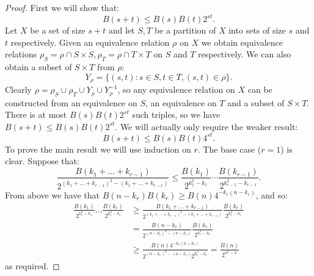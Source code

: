 \documentclass[a4paper, 12pt,reqno]{amsart}
\theoremstyle{plain}
\theoremstyle{definition}
\theoremstyle{remark}
\begin{document}
\begin{proof}
    First we will show that:
    \begin{equation*}
        B(s+t) \leq B(s) B(t) 2^{st}.
    \end{equation*}
    Let $X$ be a set of size $s+t$ and let $S,T$ be a partition of $X$ into sets of size $s$ and $t$ respectively.
    Given an equivalence relation $\rho$ on $X$ we obtain equivalence relations $\rho_S = \rho \cap S \times S , \rho_T = \rho \cap T \times T$ on $S$ and $T$ respectively.
    We can also obtain a subset of $S \times T$ from $\rho$:
    \begin{equation*}
        Y_\rho = \{ (s,t): s \in S , t \in T , (s,t) \in \rho \}.
    \end{equation*}
    Clearly $\rho = \rho_S \cup \rho_T \cup Y_\rho \cup Y_\rho^{-1}$, so any equivalence relation on $X$ can be constructed from an equivalence on $S$, an equivalence on $T$ and a subset of $S \times T$.
    There is at most $B(s) B(t) 2^{st}$ such triples, so we have $B(s+t) \leq B(s) B(t) 2^{st}$.
    We will actually only require the weaker result:
    \begin{equation*}
        B(s+t) \leq B(s) B(t) 4^{st}.
    \end{equation*}
    To prove the main result we will use induction on $r$.
    The base case ($r=1$) is clear.
    Suppose that:
    \begin{equation*}
        \frac{B(k_1 + \dots + k_{r-1})}{2^{(k_1 + \dots + k_{r-1})^2 - (k_1 + \dots + k_{r-1})}} \leq \frac{B(k_1)}{2^{k_1^2 - k_1}}  \cdots \frac{B(k_{r-1})}{2^{k_{r-1}^2 - k_{r-1}}}.
    \end{equation*}
    From above we have that $B(n-k_r) B(k_r) \geq B(n) 4^{-k_r(n-k_r)}$, and so:
    \begin{align*}
        \frac{B(k_1)}{2^{k_1^2 - k_1}}  \dots \frac{B(k_{r})}{2^{k_{r}^2 - k_{r}}}  
        & \geq \frac{B(k_1 + \dots + k_{r-1})}{2^{(k_1 + \dots + k_{r-1})^2 - (k_1 + \dots + k_{r-1})}} \frac{B(k_{r})}{2^{k_{r}^2 - k_{r}}} \\
        &= \frac{B(n - k_r)}{2^{(n-k_r)^2 - (n-k_r)}} \frac{B(k_{r})}{2^{k_{r}^2 - k_{r}}} \\
        & \geq \frac{B(n) 4^{-k_r(n-k_r)}}{2^{(n-k_r)^2 - (n-k_r)}2^{k_{r}^2 - k_{r}}} = \frac{B(n)}{2^{n^2 - n}}
    \end{align*}
    as required.
\end{proof}
\end{document}
